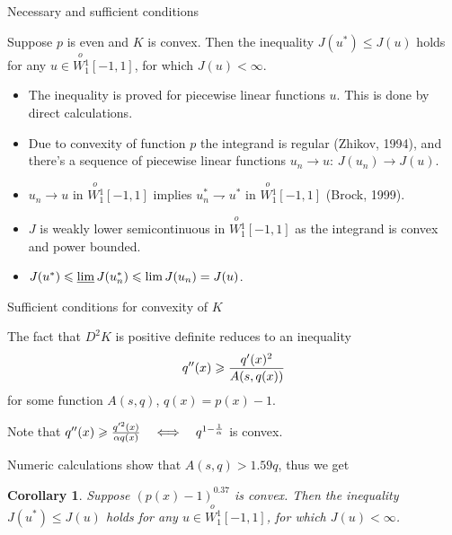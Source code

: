 \documentclass{beamer}\usepackage[]{graphicx}\usepackage[]{color}
\renewcommand{\ge}{\geqslant}
\renewcommand{\le}{\leqslant}
\newcommand{\Wf}{\stackrel{o\ }{W{}_1^1}}
\newtheorem{cor}{Corollary}
\begin{document}
\begin{frame}{Necessary and sufficient conditions}

\begin{theorem}
Suppose $p$ is even and $K$ is convex.
Then the inequality $J(u^*) \le J(u)$ holds for any $u \in \Wf[-1, 1]$, for which $J(u) < \infty$.
\end{theorem}

\begin{itemize}
\item The inequality is proved for piecewise linear functions $u$.
This is done by direct calculations.

\item Due to convexity of function $p$ the integrand is regular (Zhikov, 1994),
and there's a sequence of piecewise linear functions $u_n \to u$: $J(u_n) \to J(u)$.

\item $u_n \to u$ in $\Wf[-1, 1]$ implies $u_n^* \rightharpoondown u^*$ in $\Wf[-1, 1]$ (Brock, 1999).

\item $J$ is weakly lower semicontinuous in $\Wf[-1, 1]$ as the integrand is convex and power bounded.

\item $J(u^*) \le \varliminf J(u_n^*) \le \lim J(u_n) = J(u)$.
\end{itemize}

\end{frame}


\begin{frame}{Sufficient conditions for convexity of $K$}

The fact that $D^2 K$ is positive definite reduces to an inequality
$$q''(x) \ge {q'(x)^2 \over A(s, q(x))}$$
for some function $A(s, q)$, $q(x) = p(x) - 1$.

Note that \quad $q''(x) \ge {q'^2(x) \over \alpha q(x)} \quad \Longleftrightarrow \quad q^{1 - {1 \over \alpha}}$ is convex.

Numeric calculations show that $A(s, q) > 1.59 q$, thus we get
\begin{cor}
Suppose $(p(x) - 1)^{0.37}$ is convex.
Then the inequality $J(u^*) \le J(u)$ holds for any $u \in \Wf[-1, 1]$, for which $J(u) < \infty$.
\end{cor}

\end{frame}
\end{document}
